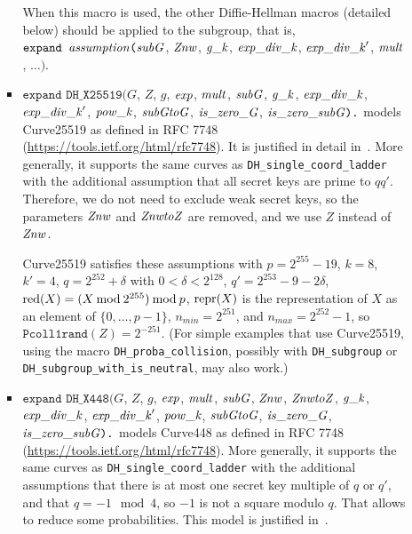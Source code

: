 \documentclass{article}
\begin{document}
\begin{itemize}
\begin{itemize}
\begin{itemize}
       When this macro is used, the other Diffie-Hellman macros (detailed below)
       should be applied to the subgroup, that is,
       $\texttt{expand\ }\vn{assumption}\texttt{(}\vn{subG}$, $\mathit{Znw}$, $\mathit{g\_k}$, $\mathit{exp\_div\_k}$, $\mathit{exp\_div\_k}'$, $\mathit{mult}$, $\dots\texttt{).}$


     \item $\texttt{expand\ DH\_X25519}(G$, $Z$, $g$, $\mathit{exp}$, $\mathit{mult}$, $\mathit{subG}$, $\mathit{g\_k}$, $\mathit{exp\_div\_k}$, $\mathit{exp\_div\_k}'$, $\mathit{pow\_k}$, $\mathit{subGtoG}$, $\mathit{is\_zero\_G}$, $\mathit{is\_zero\_subG}\texttt{).}$ models Curve25519 as defined in RFC 7748 (\url{https://tools.ietf.org/html/rfc7748}). It is justified in detail in~\cite{LippBlanchetBharagavanInria19}.
   More generally, it supports the same curves as \texttt{DH\_single\_coord\_ladder}
   with the additional assumption that all secret keys are prime to $qq'$. 
   Therefore, we do not need to exclude weak secret keys, so the
   parameters $\mathit{Znw}$ and $\mathit{ZnwtoZ}$ are removed, and we use $Z$ instead of $\mathit{Znw}$.

   Curve25519 satisfies these assumptions with
   $p = 2^{255}-19$,
   $k = 8$, $k' = 4$, $q = 2^{252} + \delta$ with $0 < \delta < 2^{128}$,
      $q' = 2^{253} - 9 - 2\delta$,
    $\mathrm{red}(X) = (X \mathbin{\mathrm{mod}} 2^{255})\mathbin{\mathrm{mod}} p$, $\mathrm{repr}(X)$ is the representation 
      of $X$ as an element of $\{0, \dots, p-1\}$,
    $n_{min} = 2^{251}$, and $n_{max} = 2^{252}-1$, so $\texttt{Pcoll1rand}(Z) = 2^{-251}$.
       (For simple examples that use Curve25519, using the macro 
      \texttt{DH\_proba\_collision}, possibly with \texttt{DH\_subgroup} or
      \texttt{DH\_subgroup\_with\_is\_neutral}, may also work.)

     \item $\texttt{expand\ DH\_X448}(G$, $Z$, $g$, $\mathit{exp}$, $\mathit{mult}$, $\mathit{subG}$, $\mathit{Znw}$, $\mathit{ZnwtoZ}$, $\mathit{g\_k}$, $\mathit{exp\_div\_k}$, $\mathit{exp\_div\_k}'$, $\mathit{pow\_k}$, $\mathit{subGtoG}$, $\mathit{is\_zero\_G}$, $\mathit{is\_zero\_subG}\texttt{).}$ models Curve448 as defined in RFC 7748
(\url{https://tools.ietf.org/html/rfc7748}).
   More generally, it supports the same curves as \texttt{DH\_single\_coord\_ladder}
   with the additional assumptions that there is at most one secret key
   multiple of $q$ or $q'$, and that $q = -1 \mod 4$, so $-1$ is not a 
   square modulo $q$. That allows to reduce some probabilities.
   This model is justified in~\cite{LippBlanchetBharagavanInria19}.

     \end{itemize}


\end{itemize}
\end{itemize}
\end{document}
